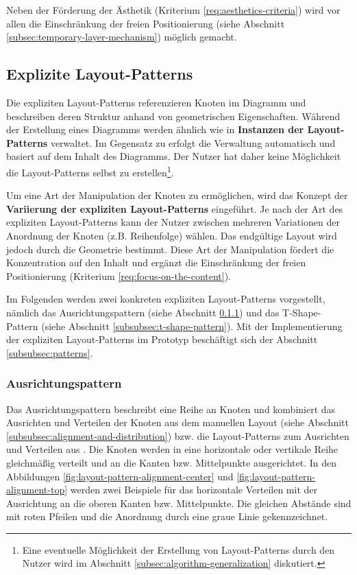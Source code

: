Neben der Förderung der Ästhetik (Kriterium \ref{req:aesthetics-criteria}) wird vor allen die Einschränkung der freien Positionierung (siehe Abschnitt \ref{subsec:temporary-layer-mechanism}) möglich gemacht.

\subsection{Explizite Layout-Patterns}
\label{subsec:explicit-layout-patterns}

Die expliziten Layout-Patterns referenzieren Knoten im Diagramm und beschreiben deren Struktur anhand von geometrischen Eigenschaften. Während der Erstellung eines Diagramms werden ähnlich wie in \cite{Maier12A-Pattern-based} \textbf{Instanzen der Layout-Patterns} verwaltet. Im Gegensatz zu \cite{Maier12A-Pattern-based} erfolgt die Verwaltung automatisch und basiert auf dem Inhalt des Diagramms. Der Nutzer hat daher keine Möglichkeit die Layout-Patterns selbst zu erstellen\footnote{Eine eventuelle Möglichkeit der Erstellung von Layout-Patterns durch den Nutzer wird im Abschnitt \ref{subsec:algorithm-generalization} diskutiert.}.

Um eine Art der Manipulation der Knoten zu ermöglichen, wird das Konzept der \textbf{Variierung der expliziten Layout-Patterns} eingeführt. Je nach der Art des expliziten Layout-Patterns kann der Nutzer zwischen mehreren Variationen der Anordnung der Knoten (z.B. Reihenfolge) wählen. Das endgültige Layout wird jedoch durch die Geometrie bestimmt. Diese Art der Manipulation fördert die Konzentration auf den Inhalt und ergänzt die Einschränkung der freien Positionierung (Kriterium \ref{req:focus-on-the-content}).

Im Folgenden werden zwei konkreten expliziten Layout-Patterns vorgestellt, nämlich das Ausrichtungspattern (siehe Abschnitt \ref{subsubsec:alignment-pattern}) und das T-Shape-Pattern (siehe Abschnitt \ref{subsubsec:t-shape-pattern}). Mit der Implementierung der expliziten Layout-Patterns im Prototyp beschäftigt sich der Abschnitt \ref{subsubsec:patterns}.

\subsubsection{Ausrichtungspattern}
\label{subsubsec:alignment-pattern}

Das Ausrichtungspattern beschreibt eine Reihe an Knoten und kombiniert das Ausrichten und Verteilen der Knoten aus dem manuellen Layout (siehe Abschnitt \ref{subsubsec:alignment-and-distribution}) bzw. die Layout-Patterns zum Ausrichten und Verteilen aus \cite[S.143ff und S.136ff]{Maier12A-Pattern-based}. Die Knoten werden in eine horizontale oder vertikale Reihe gleichmäßig verteilt und an die Kanten bzw. Mittelpunkte ausgerichtet. In den Abbildungen \ref{fig:layout-pattern-alignment-center} und \ref{fig:layout-pattern-alignment-top} werden zwei Beispiele für das horizontale Verteilen mit der Ausrichtung an die oberen Kanten bzw. Mittelpunkte. Die gleichen Abstände sind mit roten Pfeilen und die Anordnung durch eine graue Linie gekennzeichnet.

